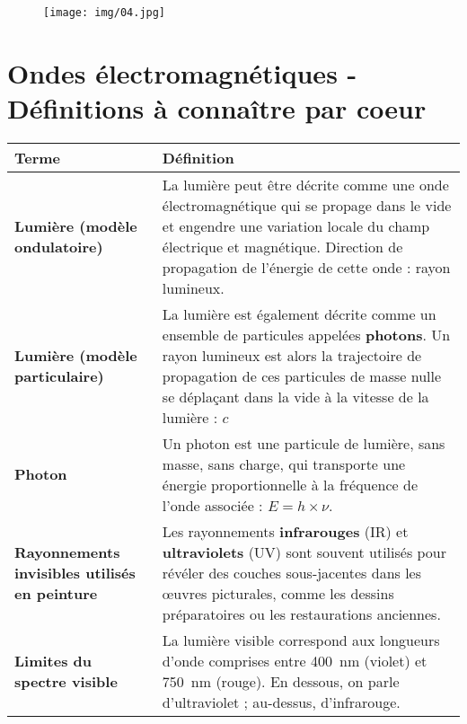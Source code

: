 \documentclass[a4paper,12pt]{article}
\begin{document}
\begin{figure}[H]
  \centering
  \texttt{[image: img/04.jpg]}
\end{figure}

\begin{figure}[H]
  \centering
\end{figure}

\section*{Ondes électromagnétiques - Définitions à connaître par coeur}

\begin{tabular}{p{} p{}}
  \toprule
  \textbf{Terme} & \textbf{Définition} \\
  \midrule
  \textbf{Lumière (modèle ondulatoire)} & 
  La lumière peut être décrite comme une onde électromagnétique qui se propage dans le vide et engendre une variation locale du champ électrique et magnétique.
  Direction de propagation de l’énergie de cette onde : rayon lumineux. \\
  
  \midrule

  \textbf{Lumière (modèle particulaire)} &
  La lumière est également décrite comme un ensemble de particules appelées \textbf{photons}. Un rayon lumineux est alors la trajectoire de propagation de ces particules de masse nulle se déplaçant dans la vide à la vitesse de la lumière : $c$ \\

  \midrule
  
  \textbf{Photon} &
  Un photon est une particule de lumière, sans masse, sans charge, qui transporte une énergie proportionnelle à la fréquence de l’onde associée : $E = h \times \nu$. \\
  \midrule
  
  \textbf{Rayonnements invisibles utilisés en peinture} &
  Les rayonnements \textbf{infrarouges} (IR) et \textbf{ultraviolets} (UV) sont souvent utilisés pour révéler des couches sous-jacentes dans les œuvres picturales, comme les dessins préparatoires ou les restaurations anciennes. \\
  \midrule
  
  \textbf{Limites du spectre visible} &
  La lumière visible correspond aux longueurs d’onde comprises entre \SI{400}{\nano\meter} (violet) et \SI{750}{\nano\meter} (rouge). En dessous, on parle d’ultraviolet ; au-dessus, d’infrarouge. \\
  \bottomrule
  \end{tabular}
\end{document}
